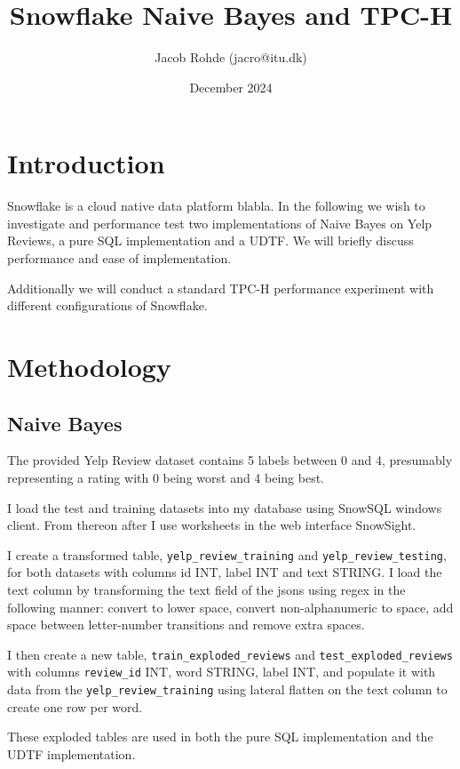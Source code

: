 \documentclass{article}
\title{Snowflake Naive Bayes and TPC-H}
\author{Jacob Rohde (jacro@itu.dk)}
\date{December 2024}
\begin{document}
\maketitle

\section{Introduction}
Snowflake\cite{snowflake_2016} is a cloud native data platform blabla. 
In the following we wish to investigate and performance test two implementations of Naive Bayes on Yelp Reviews, a pure SQL implementation and a UDTF. We will briefly discuss performance and ease of implementation.

\bigskip
Additionally we will conduct a standard TPC-H performance experiment with different configurations of Snowflake. 

\section{Methodology}

\subsection{Naive Bayes}
The provided Yelp Review dataset contains 5 labels between 0 and 4, presumably representing a rating with 0 being worst and 4 being best. 

\medskip \noindent I load the test and training datasets into my database using SnowSQL windows client. From thereon after I use worksheets in the web interface SnowSight. 

\medskip \noindent I create a transformed table, \texttt{yelp\_review\_training} and \texttt{yelp\_review\_testing}, for both datasets with columns id INT, label INT and text STRING. I load the text column by transforming the text field of the jsons using regex in the following manner: convert to lower space, convert non-alphanumeric to space, add space between letter-number transitions and remove extra spaces. 

\medskip \noindent I then create a new table, \texttt{train\_exploded\_reviews} and \texttt{test\_exploded\_reviews} with columns \texttt{review\_id} INT, word STRING, label INT, and populate it with data from the \texttt{yelp\_review\_training} using lateral flatten on the text column to create one row per word. 

\medskip \noindent These exploded tables are used in both the pure SQL implementation and the UDTF implementation. 
\end{document}
